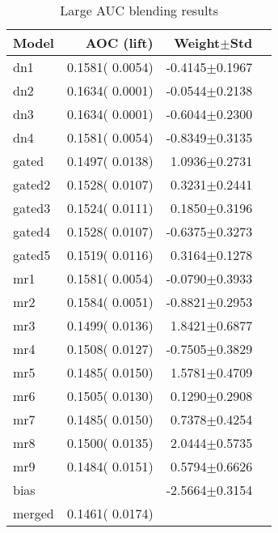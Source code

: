 \documentclass{article}
\begin{document}
\begin{table}[t]
\caption{Large AUC blending results}
\label{problems}
\vskip 0.15in
\begin{center}
\begin{small}
\begin{sc}
\begin{tabular}{lrrr}
\hline
\abovespace\belowspace
Model & AOC (lift) & Weight$\pm$Std \\
\hline
\abovespace
dn1        & 0.1581( 0.0054) & -0.4145$\pm$0.1967 \\
dn2        & 0.1634( 0.0001) & -0.0544$\pm$0.2138 \\
dn3        & 0.1634( 0.0001) & -0.6044$\pm$0.2300 \\
dn4        & 0.1581( 0.0054) & -0.8349$\pm$0.3135 \\
\abovespace
gated      & 0.1497( 0.0138) &  1.0936$\pm$0.2731 \\
gated2     & 0.1528( 0.0107) &  0.3231$\pm$0.2441 \\
gated3     & 0.1524( 0.0111) &  0.1850$\pm$0.3196 \\
gated4     & 0.1528( 0.0107) & -0.6375$\pm$0.3273 \\
gated5     & 0.1519( 0.0116) &  0.3164$\pm$0.1278 \\
\abovespace
mr1        & 0.1581( 0.0054) & -0.0790$\pm$0.3933 \\
mr2        & 0.1584( 0.0051) & -0.8821$\pm$0.2953 \\
mr3        & 0.1499( 0.0136) &  1.8421$\pm$0.6877 \\
mr4        & 0.1508( 0.0127) & -0.7505$\pm$0.3829 \\
mr5        & 0.1485( 0.0150) &  1.5781$\pm$0.4709 \\
mr6        & 0.1505( 0.0130) &  0.1290$\pm$0.2908 \\
mr7        & 0.1485( 0.0150) &  0.7378$\pm$0.4254 \\
mr8        & 0.1500( 0.0135) &  2.0444$\pm$0.5735 \\
mr9        & 0.1484( 0.0151) &  0.5794$\pm$0.6626 \\
\abovespace
bias       &                 & -2.5664$\pm$0.3154 \\
\abovespace\belowspace
merged     & 0.1461( 0.0174) &                    \\
\hline
\end{tabular}
\end{sc}
\end{small}
\end{center}
\vskip -0.1in
\end{table}
\end{document}
